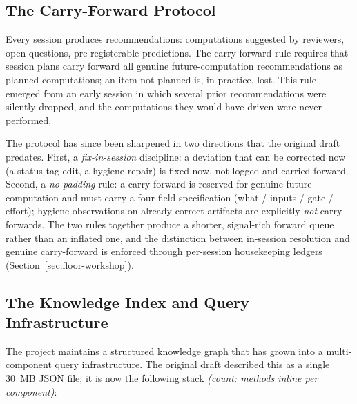 \documentclass[12pt,a4paper]{article}
\newcommand{\countnote}[1]{{\small\textit{(count: #1)}}}
\begin{document}
\subsection{The Carry-Forward Protocol}

Every session produces recommendations: computations suggested by reviewers, open questions, pre-registerable predictions. The carry-forward rule requires that session plans carry forward all genuine future-computation recommendations as planned computations; an item not planned is, in practice, lost. This rule emerged from an early session in which several prior recommendations were silently dropped, and the computations they would have driven were never performed.

The protocol has since been sharpened in two directions that the original draft predates. First, a \emph{fix-in-session} discipline: a deviation that can be corrected now (a status-tag edit, a hygiene repair) is fixed now, not logged and carried forward. Second, a \emph{no-padding} rule: a carry-forward is reserved for genuine future computation and must carry a four-field specification (what / inputs / gate / effort); hygiene observations on already-correct artifacts are explicitly \emph{not} carry-forwards. The two rules together produce a shorter, signal-rich forward queue rather than an inflated one, and the distinction between in-session resolution and genuine carry-forward is enforced through per-session housekeeping ledgers (Section~\ref{sec:floor-workshop}).

\subsection{The Knowledge Index and Query Infrastructure}
\label{sec:knowledge}

The project maintains a structured knowledge graph that has grown into a multi-component query infrastructure. The original draft described this as a single 30~MB JSON file; it is now the following stack \countnote{methods inline per component}:
\end{document}

